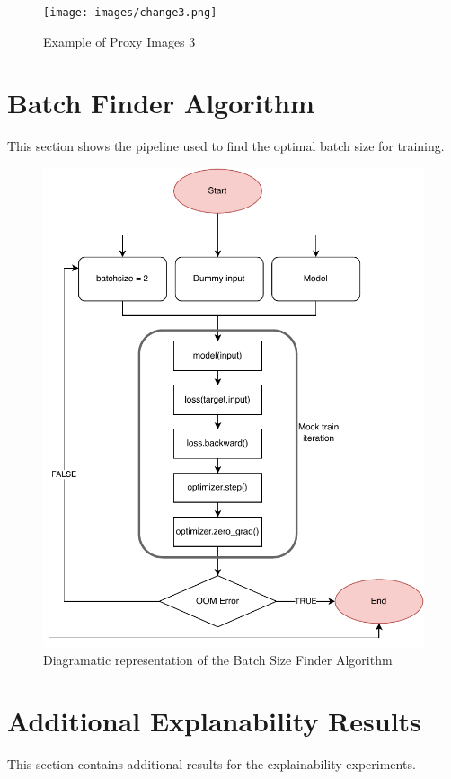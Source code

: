 \documentclass[a4paper,11pt,openright]{book}
\begin{document}
\begin{figure}[!htb]
    \centering
    \texttt{[image: images/change3.png]}
    \caption{Example of Proxy Images 3}
\end{figure}


\section{Batch Finder Algorithm}
This section shows the pipeline used to find the optimal batch size for training. 
\begin{figure}[!htb]
    \centering
    \includegraphics[width=0.6\linewidth]{images/batchsizefinder.pdf}
    \caption{Diagramatic representation of the Batch Size Finder Algorithm}
    \label{fig:bsfinder}
\end{figure}

\section{Additional Explanability Results}
This section contains additional results for the explainability experiments. 
\end{document}
